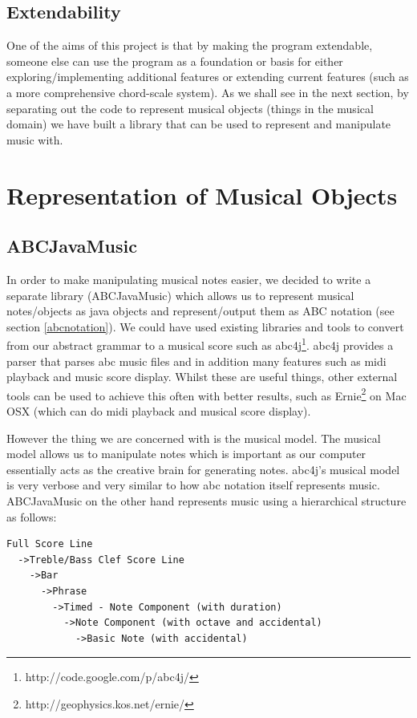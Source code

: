 \documentclass[pdftex,12pt,a4paper]{report}
\begin{document}
\subsection{Extendability}
One of the aims of this project is that by making the program extendable, someone else can use the program as a foundation or basis for either exploring/implementing additional features or extending current features (such as a more comprehensive chord-scale system). As we shall see in the next section, by separating out the code to represent musical objects (things in the musical domain) we have built a library that can be used to represent and manipulate music with.

\section{Representation of Musical Objects}

\subsection{ABCJavaMusic}
In order to make manipulating musical notes easier, we decided to write a separate library (ABCJavaMusic) which allows us to represent musical notes/objects as java objects and represent/output them as ABC notation (see section \ref{abcnotation}). We could have used existing libraries and tools to convert from our abstract grammar to a musical score such as abc4j\footnote{http://code.google.com/p/abc4j/}. abc4j provides a parser that parses abc music files and in addition many features such as midi playback and music score display. Whilst these are useful things, other external tools can be used to achieve this often with better results, such as Ernie\footnote{http://geophysics.kos.net/ernie/} on Mac OSX (which can do midi playback and musical score display).

However the thing we are concerned with is the musical model. The musical model allows us to manipulate notes which is important as our computer essentially acts as the creative brain for generating notes. abc4j's musical model is very verbose and very similar to how abc notation itself represents music. 
ABCJavaMusic on the other hand represents music using a hierarchical structure as follows:

\begin{verbatim}
Full Score Line
  ->Treble/Bass Clef Score Line
    ->Bar
      ->Phrase
        ->Timed - Note Component (with duration)
          ->Note Component (with octave and accidental)
            ->Basic Note (with accidental)
\end{verbatim}
\end{document}
